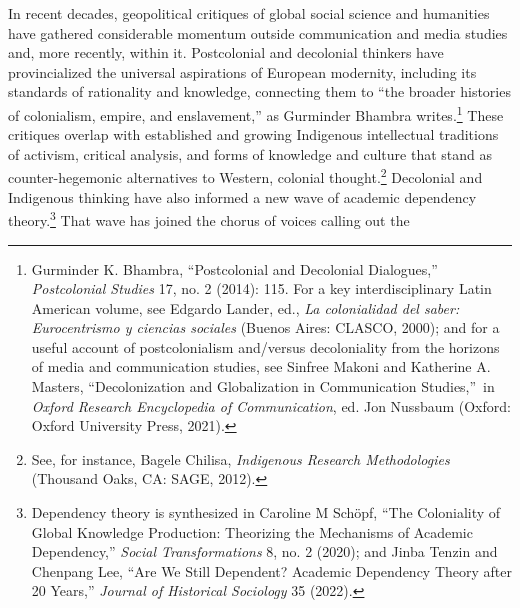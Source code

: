 \documentclass{tufte-handout}
\begin{document}
In recent decades, geopolitical critiques of global social science and
humanities have gathered considerable momentum outside communication and
media studies and, more recently, within it. Postcolonial and decolonial
thinkers have provincialized the universal aspirations of European\setcounter{footnote}{4}
modernity, including its standards of rationality and knowledge,
connecting them to ``the broader histories of colonialism, empire, and
enslavement,'' as Gurminder Bhambra writes.\footnote{Gurminder K.
  Bhambra, ``Postcolonial and Decolonial Dialogues,'' \emph{Postcolonial
  Studies} 17, no. 2 (2014): 115. For a key interdisciplinary Latin
  American volume, see Edgardo Lander, ed., \emph{La colonialidad del
  saber: Eurocentrismo y ciencias sociales} (Buenos Aires: CLASCO,
  2000); and for a useful account of postcolonialism and/versus
  decoloniality from the horizons of media and communication studies,
  see Sinfree Makoni and Katherine A. Masters, ``Decolonization and
  Globalization in Communication Studies,''~in \emph{Oxford Research
  Encyclopedia of Communication}, ed. Jon Nussbaum (Oxford: Oxford
  University Press, 2021).} These critiques overlap with established and
growing Indigenous intellectual traditions of activism, critical
analysis, and forms of knowledge and culture that stand as
counter-hegemonic alternatives to Western, colonial thought.\footnote{See,
  for instance, Bagele Chilisa, \emph{Indigenous Research Methodologies}
  (Thousand Oaks, CA: SAGE, 2012).} Decolonial and Indigenous thinking
have also informed a new wave of academic dependency theory.\footnote{Dependency
  theory is synthesized in Caroline M Schöpf, ``The Coloniality of
  Global Knowledge Production: Theorizing the Mechanisms of Academic
  Dependency,'' \emph{Social Transformations} 8, no. 2 (2020); and Jinba
  Tenzin and Chenpang Lee, ``Are We Still Dependent? Academic Dependency
  Theory after 20 Years,'' \emph{Journal of Historical Sociology} 35
  (2022).} That wave has joined the chorus of voices calling out the
\end{document}
